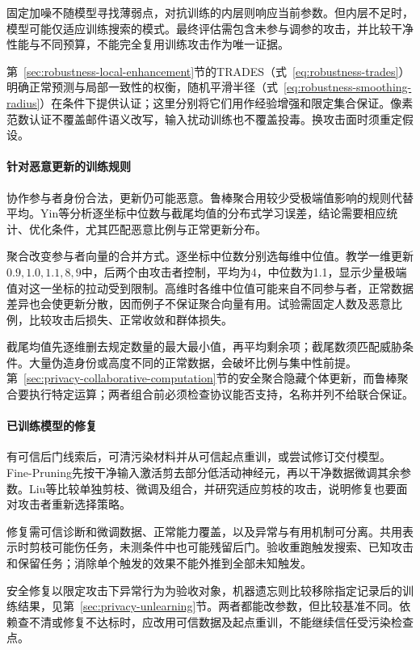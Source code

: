 固定加噪不随模型寻找薄弱点，对抗训练的内层则响应当前参数。但内层不足时，模型可能仅适应训练搜索的模式。最终评估需包含未参与调参的攻击，并比较干净性能与不同预算，不能完全复用训练攻击作为唯一证据。

第~\ref{sec:robustness-local-enhancement}节的TRADES（式~\eqref{eq:robustness-trades}）明确正常预测与局部一致性的权衡，随机平滑半径（式~\eqref{eq:robustness-smoothing-radius}）在条件下提供认证；这里分别将它们用作经验增强和限定集合保证。像素范数认证不覆盖邮件语义改写，输入扰动训练也不覆盖投毒。换攻击面时须重定假设。

\paragraph{针对恶意更新的训练规则}

协作参与者身份合法，更新仍可能恶意。鲁棒聚合用较少受极端值影响的规则代替平均。Yin等分析逐坐标中位数与截尾均值的分布式学习误差，结论需要相应统计、优化条件，尤其匹配恶意比例与正常更新分布。

聚合改变参与者向量的合并方式。逐坐标中位数分别选每维中位值。教学一维更新$0.9,1.0,1.1,8,9$中，后两个由攻击者控制，平均为4，中位数为1.1，显示少量极端值对这一坐标的拉动受到限制。高维时各维中位值可能来自不同参与者，正常数据差异也会使更新分散，因而例子不保证聚合向量有用。试验需固定人数及恶意比例，比较攻击后损失、正常收敛和群体损失。

截尾均值先逐维删去规定数量的最大最小值，再平均剩余项；截尾数须匹配威胁条件。大量伪造身份或高度不同的正常数据，会破坏比例与集中性前提。第~\ref{sec:privacy-collaborative-computation}节的安全聚合隐藏个体更新，而鲁棒聚合要执行特定运算；两者组合前必须检查协议能否支持，名称并列不给联合保证。

\paragraph{已训练模型的修复}

有可信后门线索后，可清污染材料并从可信起点重训，或尝试修订交付模型。Fine-Pruning先按干净输入激活剪去部分低活动神经元，再以干净数据微调其余参数。Liu等比较单独剪枝、微调及组合，并研究适应剪枝的攻击，说明修复也要面对攻击者重新选择策略。

修复需可信诊断和微调数据、正常能力覆盖，以及异常与有用机制可分离。共用表示时剪枝可能伤任务，未测条件中也可能残留后门。验收重跑触发搜索、已知攻击和保留任务；消除单个触发的效果不能外推到全部未知触发。

安全修复以限定攻击下异常行为为验收对象，机器遗忘则比较移除指定记录后的训练结果，见第~\ref{sec:privacy-unlearning}节。两者都能改参数，但比较基准不同。依赖查不清或修复不达标时，应改用可信数据及起点重训，不能继续信任受污染检查点。


